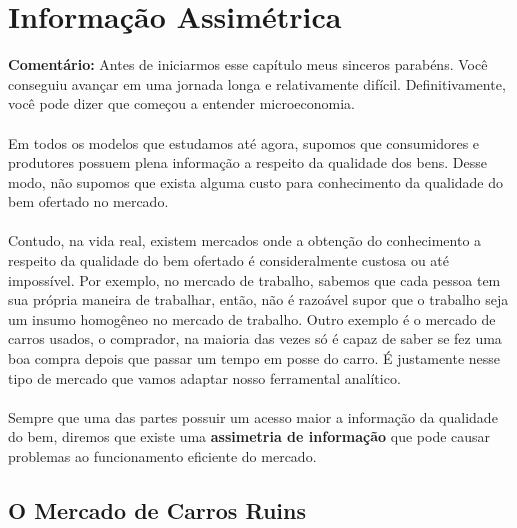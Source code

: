 \documentclass[a4paper,11pt,oneside]{book}
\theoremstyle{definition}
\theoremstyle{break}
\begin{document}
\chapter{Informação Assimétrica}

\textbf{Comentário:} Antes de iniciarmos esse capítulo meus sinceros parabéns. Você conseguiu avançar em uma jornada longa e relativamente difícil. Definitivamente, você pode dizer que começou a entender microeconomia.
\\~\\
Em todos os modelos que estudamos até agora, supomos que consumidores e produtores possuem plena informação a respeito da qualidade dos bens. Desse modo, não supomos que exista alguma custo para conhecimento da qualidade do bem ofertado no mercado.
\\~\\
Contudo, na vida real, existem mercados onde a obtenção do conhecimento a respeito da qualidade do bem ofertado é consideralmente custosa ou até impossível. Por exemplo, no mercado de trabalho, sabemos que cada pessoa tem sua própria maneira de trabalhar, então, não é razoável supor que o trabalho seja um insumo homogêneo no mercado de trabalho. Outro exemplo é o mercado de carros usados, o comprador, na maioria das vezes só é capaz de saber se fez uma boa compra depois que passar um tempo em posse do carro. É justamente nesse tipo de mercado que vamos adaptar nosso ferramental analítico.
\\~\\
Sempre que uma das partes possuir um acesso maior a informação da qualidade do bem, diremos que existe uma \textbf{assimetria de informação} que pode causar problemas ao funcionamento eficiente do mercado.


\section{O Mercado de Carros Ruins}
\end{document}
